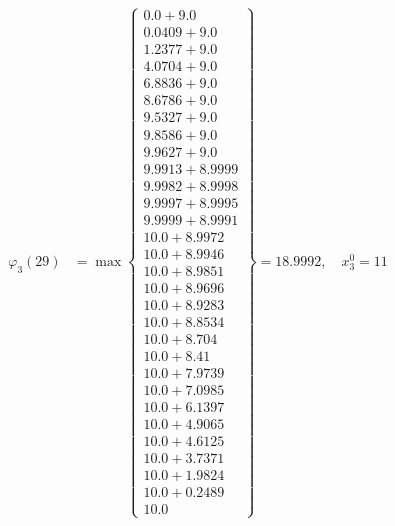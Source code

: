 \documentclass{article}
\begin{document}
\begin{align*}
\varphi_{3}(29) &= \max \left\{ \begin{array}{c}
0.0 + 9.0 \\
 0.0409 + 9.0 \\
 1.2377 + 9.0 \\
 4.0704 + 9.0 \\
 6.8836 + 9.0 \\
 8.6786 + 9.0 \\
 9.5327 + 9.0 \\
 9.8586 + 9.0 \\
 9.9627 + 9.0 \\
 9.9913 + 8.9999 \\
 9.9982 + 8.9998 \\
 9.9997 + 8.9995 \\
 9.9999 + 8.9991 \\
 10.0 + 8.9972 \\
 10.0 + 8.9946 \\
 10.0 + 8.9851 \\
 10.0 + 8.9696 \\
 10.0 + 8.9283 \\
 10.0 + 8.8534 \\
 10.0 + 8.704 \\
 10.0 + 8.41 \\
 10.0 + 7.9739 \\
 10.0 + 7.0985 \\
 10.0 + 6.1397 \\
 10.0 + 4.9065 \\
 10.0 + 4.6125 \\
 10.0 + 3.7371 \\
 10.0 + 1.9824 \\
 10.0 + 0.2489 \\
 10.0
\end{array} \right\}=18.9992, \quad x_{3}^0=11\\
  

\end{align*}
\end{document}
